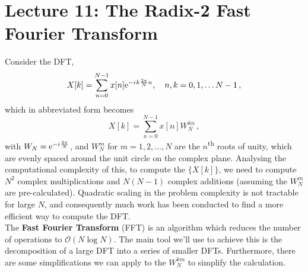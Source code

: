 \section{Lecture 11: The Radix-2 Fast Fourier Transform}

Consider the DFT,
%
\begin{displaymath}
  X[k] = \sum_{n=0}^{N-1}x[n]\mathrm{e}^{-{i\mkern1mu} k\frac{2\pi}{N}n},\quad
  n,k = 0, 1, \hdots N-1 \,,
\end{displaymath}
%
which in abbreviated form becomes
%
\begin{displaymath}
  X[k] = \sum_{n=0}^{N-1}x[n]W_N^{kn} \,,
\end{displaymath}
%
with $W_N = \mathrm{e}^{-{i\mkern1mu}\frac{2\pi}{N}}$, and $W_N^m$ for $m=1,2,\hdots,N$
are the $n$\textsuperscript{th} roots of unity, which are evenly spaced
around the unit circle on the complex plane. Analysing the computational
complexity of this, to compute the $\{X[k]\}$, we need to compute $N^2$
complex multiplications and $N(N-1)$ complex additions (assuming the
$W_N^m$ are pre-calculated). Quadratic scaling in the problem complexity
is not tractable for large $N$, and consequently much work has been
conducted to find a more efficient way to compute the DFT.\\

The \textbf{Fast Fourier Transform} (FFT) is an algorithm which reduces
the number of operations to $\mathcal{O}(N\log N)$. The main tool we'll
use to achieve this is the decomposition of a large DFT into a series of
smaller DFTs. Furthermore, there are some simplifications we can apply
to the $W_N^{km}$ to simplify the calculation.

